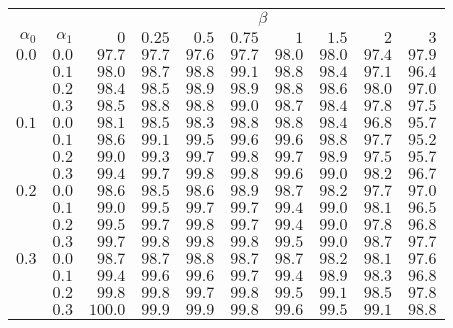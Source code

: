 \begin{tabular}{rr|rrrrrrrr}
\hline\hline
 && \multicolumn{8}{c}{$\beta$}\\
 $\alpha_0$ & $\alpha_1$ & $0$ & $0.25$ & $0.5$ & $0.75$ & $1$ & $1.5$ & $2$ & $3$ \\ 
 \hline
$0.0$ & $0.0$ & $ 97.7$ & $97.7$ & $97.6$ & $97.7$ & $98.0$ & $98.0$ & $97.4$ & $97.9$\\ 
 & $0.1$ & $ 98.0$ & $98.7$ & $98.8$ & $99.1$ & $98.8$ & $98.4$ & $97.1$ & $96.4$\\ 
 & $0.2$ & $ 98.4$ & $98.5$ & $98.9$ & $98.9$ & $98.8$ & $98.6$ & $98.0$ & $97.0$\\ 
 & $0.3$ & $ 98.5$ & $98.8$ & $98.8$ & $99.0$ & $98.7$ & $98.4$ & $97.8$ & $97.5$\\ 
\hline 
 $0.1$ & $0.0$ & $ 98.1$ & $98.5$ & $98.3$ & $98.8$ & $98.8$ & $98.4$ & $96.8$ & $95.7$\\ 
 & $0.1$ & $ 98.6$ & $99.1$ & $99.5$ & $99.6$ & $99.6$ & $98.8$ & $97.7$ & $95.2$\\ 
 & $0.2$ & $ 99.0$ & $99.3$ & $99.7$ & $99.8$ & $99.7$ & $98.9$ & $97.5$ & $95.7$\\ 
 & $0.3$ & $ 99.4$ & $99.7$ & $99.8$ & $99.8$ & $99.6$ & $99.0$ & $98.2$ & $96.7$\\ 
\hline 
 $0.2$ & $0.0$ & $ 98.6$ & $98.5$ & $98.6$ & $98.9$ & $98.7$ & $98.2$ & $97.7$ & $97.0$\\ 
 & $0.1$ & $ 99.0$ & $99.5$ & $99.7$ & $99.7$ & $99.4$ & $99.0$ & $98.1$ & $96.5$\\ 
 & $0.2$ & $ 99.5$ & $99.7$ & $99.8$ & $99.7$ & $99.4$ & $99.0$ & $97.8$ & $96.8$\\ 
 & $0.3$ & $ 99.7$ & $99.8$ & $99.8$ & $99.8$ & $99.5$ & $99.0$ & $98.7$ & $97.7$\\ 
\hline 
 $0.3$ & $0.0$ & $ 98.7$ & $98.7$ & $98.8$ & $98.7$ & $98.7$ & $98.2$ & $98.1$ & $97.6$\\ 
 & $0.1$ & $ 99.4$ & $99.6$ & $99.6$ & $99.7$ & $99.4$ & $98.9$ & $98.3$ & $96.8$\\ 
 & $0.2$ & $ 99.8$ & $99.8$ & $99.7$ & $99.8$ & $99.5$ & $99.1$ & $98.5$ & $97.8$\\ 
 & $0.3$ & $100.0$ & $99.9$ & $99.9$ & $99.8$ & $99.6$ & $99.5$ & $99.1$ & $98.8$\\ 
 \hline 
 \end{tabular}